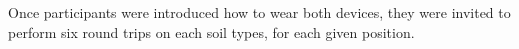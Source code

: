\documentclass[10pt,conference]{IEEEtran}
\begin{document}





Once participants were introduced how to wear both devices, %
they were invited to perform six round trips on each soil types, for each given position. %
\end{document}
